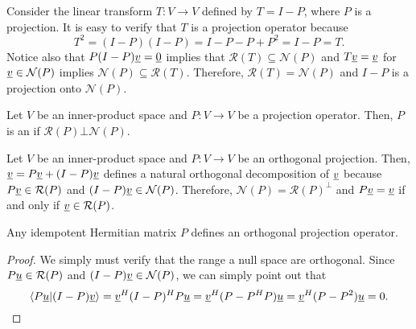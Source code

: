 \begin{example}
Consider the linear transform $T \colon V \rightarrow V$ defined by $T = I - P$, where $P$ is a projection.
It is easy to verify that $T$ is a projection operator because
\[ T^2 = (I-P)(I-P) = I - P- P + P^2 = I-P = T .\]
Notice also that $P(I-P) \underline{v} = \underline{0}$ implies that $\mathcal{R}(T) \subseteq \mathcal{N}(P)$ and $T \underline{v} = \underline{v}$ for $\underline{v} \in \mathcal{N}(P)$ implies $\mathcal{N}(P) \subseteq \mathcal{R}(T)$.
Therefore, $\mathcal{R}(T) = \mathcal{N}(P)$ and $I-P$ is a projection onto $\mathcal{N}(P)$.
\end{example}

\begin{definition}
\label{definition:OrthogonalProjection}
Let $V$ be an inner-product space and $P \colon V \rightarrow V$ be a projection operator.
Then, $P$ is an  if $\mathcal{R}(P) \bot \mathcal{N}(P)$.
\end{definition}

\begin{example}
Let $V$ be an inner-product space and $P \colon V \rightarrow V$ be an orthogonal projection.
Then, $\underline{v} = P \underline{v} + (I-P) \underline{v}$ defines a natural orthogonal decomposition of $\underline{v}$ because $P \underline{v} \in \mathcal{R}(P)$ and $(I-P) \underline{v} \in \mathcal{N}(P)$.
Therefore, $\mathcal{N}(P) = \mathcal{R}(P)^{\bot}$ and $P \underline{v} = \underline{v}$ if and only if $\underline{v} \in \mathcal{R}(P)$.
\end{example}

\begin{theorem}
Any idempotent Hermitian matrix $P$ defines an orthogonal projection operator.
\end{theorem}
\begin{proof}
We simply must verify that the range a null space are orthogonal.
Since $P \underline{u} \in \mathcal{R}(P)$ and $(I-P) \underline{v} \in \mathcal{N}(P)$, we can simply point out that
\[ \langle P\underline{u} | (I-P)\underline{v} \rangle = \underline{v}^H (I-P)^H P \underline{u} = \underline{v}^H (P - P^H P) \underline{u} = \underline{v}^H (P - P^2) \underline{u} = 0. \]
\end{proof}


